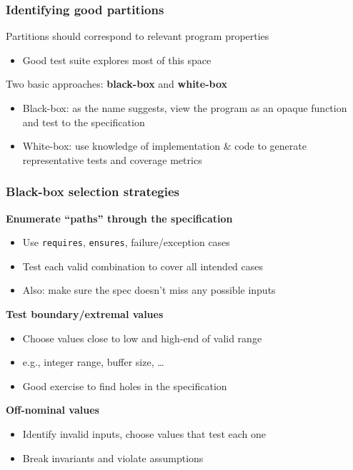 \documentclass[10pt,xcolor={dvipsnames}]{beamer}
\begin{document}
\begin{frame}

\frametitle{Identifying good partitions}

Partitions should correspond to relevant program properties
\begin{itemize}
\item Good test suite explores most of this space\\[1.5em]
\end{itemize}

\pause
Two basic approaches: \textbf{black-box} and \textbf{white-box}
\begin{itemize}
\item Black-box: as the name suggests, view the program as an opaque function and test to the specification\\[0.5em]
\item White-box: use knowledge of implementation \& code to generate representative tests and coverage metrics
\end{itemize}

\end{frame}


\begin{frame}

\frametitle{Black-box selection strategies}

\textbf{Enumerate ``paths'' through the specification}
\begin{itemize}
\item Use \texttt{requires}, \texttt{ensures}, failure/exception cases \\[0.5em]
\item Test each valid combination to cover all intended cases \\[0.5em]
\item Also: make sure the spec doesn't miss any possible inputs \\[1em]
\end{itemize}

\pause
\textbf{Test boundary/extremal values}
\begin{itemize}
\item Choose values close to low and high-end of valid range \\[0.5em]
\item e.g., integer range, buffer size, \ldots \\[0.5em]
\item Good exercise to find holes in the specification \\[1em]
\end{itemize}

\pause
\textbf{Off-nominal values}
\begin{itemize}
\item Identify invalid inputs, choose values that test each one \\[0.5em]
\item Break invariants and violate assumptions
\end{itemize}

\end{frame}
\end{document}
